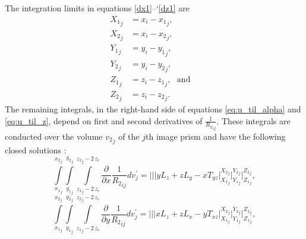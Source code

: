 \documentclass[P]{BrJG_submit}
\begin{document}
The integration limits in equations \ref{dx1}--`\ref{dz1} are
\begin{equation}
\begin{array}{ll}
{X_1}_{j} &= x_i - {x_1}_{j} , \\
{X_2}_{j} &= x_i - {x_2}_{j} , \\
{Y_1}_{j} &= y_i - {y_1}_{j} , \\
{Y_2}_{j} &= y_i - {y_2}_{j} , \\
{Z_1}_{j} &= z_i - {z_1}_{j} , \: \: \: \textrm{and}  \\
{Z_2}_{j} &= z_i - {z_2}_{j}.
\end{array} \quad
\label{eq:Nagy_limits_1}
\end{equation}
The remaining integrals, in the right-hand side of equations 
\ref{eq:u_til_alpha} and \ref{eq:u_til_z}, depend on first and second derivatives 
of ${\frac{1}{{R_2}_{ij}}}$.
These integrals are conducted over the volume ${v_{2}}_{j}$ of the $j$th image prism and have the following closed solutions \citep{Nagyetal2000, Nagyetal2002}:
\begin{equation}
\int\limits_{{x_{1}}_{j}}^{{x_{2}}_{j}} \! 
\int\limits_{{y_{1}}_{j}}^{{y_{2}}_{j}} \! 
\int\limits_{{z_{1}}_{j} - 2 \,  z_c}^{{z_{2}}_{j} - 2 \, z_c} 
\! \! \! \! \! \! \! 
\frac{\partial}{\partial x} \! {\frac{1}{{R_2}_{ij}}} dv_{j}^{\prime} \! = \!
\Bigg|\Bigg|\Bigg| 
y L_z  + z L_y  -  x  T_{yz}  \!
\Bigg|_{{X_1}_{j}}^{{X_2}_{j}} \! \Bigg|_{{Y_1}_{j}}^{{Y_2}_{j}} \! \Bigg|_{{Z_1}_{j}}^{{Z_2}_{j}},
\label{dx2}
\end{equation}
\vspace{-0.5cm}
\begin{equation}
\int\limits_{{x_{1}}_{j}}^{{x_{2}}_{j}} \! 
\int\limits_{{y_{1}}_{j}}^{{y_{2}}_{j}} 
\int\limits_{{z_{1}}_{j} - 2 \, z_c}^{{z_{2}}_{j} - 2 \, z_c}
\! \! \! \! \! \! \! \!  
\frac{\partial}{\partial y} {\frac{1}{{R_2}_{ij}}} dv_{j}^{\prime} \! = \!
\Bigg|\Bigg|\Bigg|
xL_z + zL_x -  y T_{xz} \!
\Bigg|_{{X_1}_{j}}^{{X_2}_{j}} \! \Bigg|_{{Y_1}_{j}}^{{Y_2}_{j}} \! \Bigg|_{{Z_1}_{j}}^{{Z_2}_{j}},
\label{dy2}
\end{equation}
\end{document}
